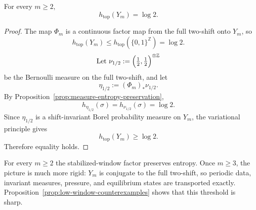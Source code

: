 \begin{corollary}\label{cor:entropy-preservation}
For every $m\ge 2$,
\[
h_{\mathrm{top}}(Y_m)=\log 2.
\]
\end{corollary}

\begin{proof}
The map $\Phi_m$ is a continuous factor map from the full two-shift onto $Y_m$, so
\[
h_{\mathrm{top}}(Y_m)\le h_{\mathrm{top}}(\{0,1\}^{\mathbb Z})=\log 2.
\]
\[
\text{Let }\nu_{1/2}:=\Bigl(\tfrac12,\tfrac12\Bigr)^{\otimes \mathbb Z}
\]
be the Bernoulli measure on the full two-shift, and let
\[
\eta_{1/2}:=(\Phi_m)_*\nu_{1/2}.
\]
By Proposition~\ref{prop:measure-entropy-preservation},
\[
h_{\eta_{1/2}}(\sigma)=h_{\nu_{1/2}}(\sigma)=\log 2.
\]
Since $\eta_{1/2}$ is a shift-invariant Borel probability measure on $Y_m$, the variational principle \cite{Walters1982} gives
\[
h_{\mathrm{top}}(Y_m)\ge \log 2.
\]
Therefore equality holds.
\end{proof}

\begin{remark}
For every $m\ge 2$ the stabilized-window factor preserves entropy. Once $m\ge 3$, the picture is much more rigid: $Y_m$ is conjugate to the full two-shift, so periodic data, invariant measures, pressure, and equilibrium states are transported exactly. Proposition~\ref{prop:low-window-counterexamples} shows that this threshold is sharp.
\end{remark}


